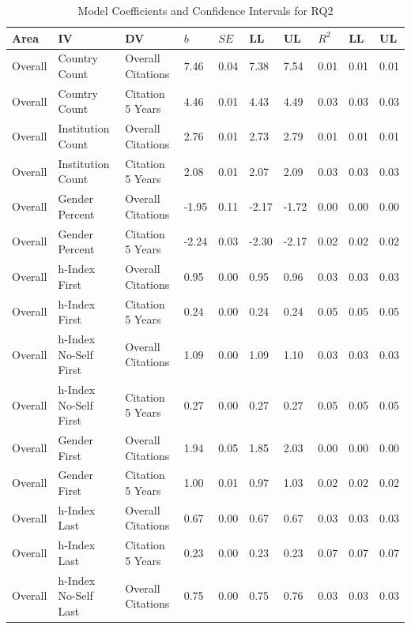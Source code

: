 \documentclass[
  man,floatsintext]{apa6}
\begin{document}
\begin{table}[tbp]

\begin{center}
\begin{threeparttable}

\caption{\label{tab:tab-rq2}Model Coefficients and Confidence Intervals for RQ2}

\scriptsize{

\begin{tabular}{llllllllll}
\toprule
Area & IV & DV & $b$ & $SE$ & LL & UL & $R^2$ & LL & UL\\
\midrule
Overall & Country Count & Overall Citations & 7.46 & 0.04 & 7.38 & 7.54 & 0.01 & 0.01 & 0.01\\
Overall & Country Count & Citation 5 Years & 4.46 & 0.01 & 4.43 & 4.49 & 0.03 & 0.03 & 0.03\\
Overall & Institution Count & Overall Citations & 2.76 & 0.01 & 2.73 & 2.79 & 0.01 & 0.01 & 0.01\\
Overall & Institution Count & Citation 5 Years & 2.08 & 0.01 & 2.07 & 2.09 & 0.03 & 0.03 & 0.03\\
Overall & Gender Percent & Overall Citations & -1.95 & 0.11 & -2.17 & -1.72 & 0.00 & 0.00 & 0.00\\
Overall & Gender Percent & Citation 5 Years & -2.24 & 0.03 & -2.30 & -2.17 & 0.02 & 0.02 & 0.02\\
Overall & h-Index First & Overall Citations & 0.95 & 0.00 & 0.95 & 0.96 & 0.03 & 0.03 & 0.03\\
Overall & h-Index First & Citation 5 Years & 0.24 & 0.00 & 0.24 & 0.24 & 0.05 & 0.05 & 0.05\\
Overall & h-Index No-Self First & Overall Citations & 1.09 & 0.00 & 1.09 & 1.10 & 0.03 & 0.03 & 0.03\\
Overall & h-Index No-Self First & Citation 5 Years & 0.27 & 0.00 & 0.27 & 0.27 & 0.05 & 0.05 & 0.05\\
Overall & Gender First & Overall Citations & 1.94 & 0.05 & 1.85 & 2.03 & 0.00 & 0.00 & 0.00\\
Overall & Gender First & Citation 5 Years & 1.00 & 0.01 & 0.97 & 1.03 & 0.02 & 0.02 & 0.02\\
Overall & h-Index Last & Overall Citations & 0.67 & 0.00 & 0.67 & 0.67 & 0.03 & 0.03 & 0.03\\
Overall & h-Index Last & Citation 5 Years & 0.23 & 0.00 & 0.23 & 0.23 & 0.07 & 0.07 & 0.07\\
Overall & h-Index No-Self Last & Overall Citations & 0.75 & 0.00 & 0.75 & 0.76 & 0.03 & 0.03 & 0.03\\

\end{tabular}}
\end{threeparttable}
\end{center}
\end{table}
\end{document}
